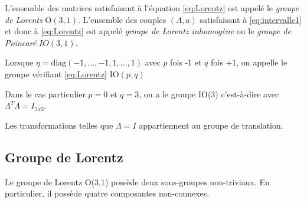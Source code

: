 L'ensemble des matrices satisfaisant à l'équation \ref{eq:Lorentz} est appelé le \textit{groupe de Lorentz} O$(3,1)$. L'ensemble des couples $(\Lambda,a)$ satisfaisant à \ref{eq:intervalle1} et donc à \ref{eq:Lorentz} est appelé \textit{groupe de Lorentz inhomogène} ou le \textit{groupe de Poincaré} $IO(3,1)$. 

\begin{rmk}
Lorsque $\eta = \text{diag}(-1,...,-1,1,...,1)$ avec $p$ fois -1 et $q$ fois +1, on appelle le groupe vérifiant \ref{eq:Lorentz} IO$(p,q)$
    
\end{rmk}
\begin{rmk}
    Dans le cas particulier $p =0$ et $q=3$, on a le groupe IO(3) c'est-à-dire avec $\Lambda ^{T} \Lambda = I_{3x3}$. 
\end{rmk}

Les transformations telles que $\Lambda =  I$ appartiennent au groupe de translation.

\subsection{Groupe de Lorentz}

Le groupe de Lorentz O(3,1) possède deux sous-groupes non-triviaux. En particulier, il possède quatre composantes non-connexes.


